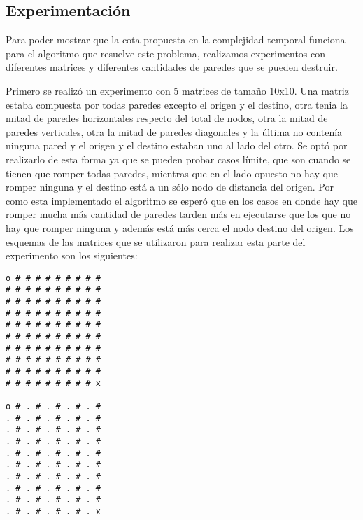 \begin{itemize}

    \subsection{Experimentación}

    

	Para poder mostrar que la cota propuesta en la complejidad temporal funciona para el algoritmo que resuelve este problema, realizamos experimentos con diferentes matrices y diferentes cantidades de paredes que se pueden destruir.

  Primero se realizó un experimento con 5 matrices de tamaño 10x10. Una matriz estaba compuesta por todas paredes excepto el origen y el destino, otra tenia la mitad de paredes horizontales respecto del total de nodos, otra la mitad de paredes verticales, otra la mitad de paredes diagonales y la última no contenía ninguna pared y el origen y el destino estaban uno al lado del otro. Se optó por realizarlo de esta forma ya que se pueden probar casos límite, que son cuando se tienen que romper todas paredes, mientras que en el lado opuesto no hay que romper ninguna y el destino está a un sólo nodo de distancia del origen. Por como esta implementado el algoritmo se esperó que en los casos en donde hay que romper mucha más cantidad de paredes tarden más en ejecutarse que los que no hay que romper ninguna y además está más cerca el nodo destino del origen. Los esquemas de las matrices que se utilizaron para realizar esta parte del experimento son los siguientes:

 \begin{codesnippet}
            \begin{verbatim}
o # # # # # # # # #
# # # # # # # # # #
# # # # # # # # # #
# # # # # # # # # #
# # # # # # # # # #
# # # # # # # # # #
# # # # # # # # # #
# # # # # # # # # #
# # # # # # # # # #
# # # # # # # # # x

o # . # . # . # . #
. # . # . # . # . #
. # . # . # . # . #
. # . # . # . # . #
. # . # . # . # . #
. # . # . # . # . #
. # . # . # . # . #
. # . # . # . # . #
. # . # . # . # . #
. # . # . # . # . x


\end{verbatim}
\end{codesnippet}
\end{itemize}
